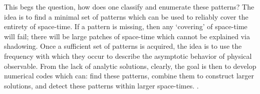 This begs the question, how does one classify and enumerate these patterns? The idea
is to find a minimal set of patterns which can be used to reliably cover the entirety of space-time.
If a pattern is missing, then any `covering' of space-time will fail; there will be large patches
of space-time which cannot be explained via shadowing. Once a sufficient set of patterns
is acquired, the idea is to use the frequency with which they occur to describe the asymptotic
behavior of physical observable. From the lack of analytic solutions, clearly, the goal is then
to develop numerical codes which can: find these patterns, combine them to construct larger solutions,
and detect these patterns within larger space-times.
.

